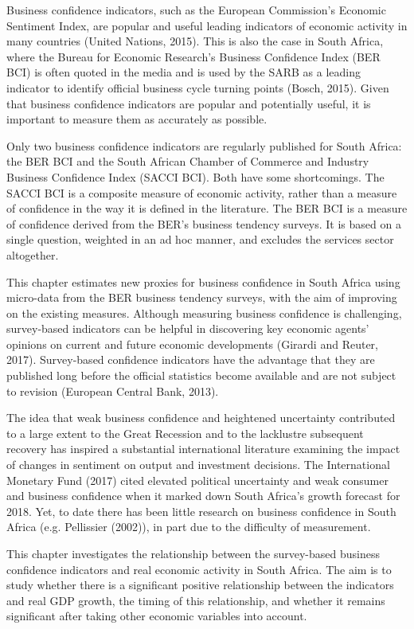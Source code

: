 \documentclass[11pt,]{article}
\begin{document}
Business confidence indicators, such as the European Commission's
Economic Sentiment Index, are popular and useful leading indicators of
economic activity in many countries (United Nations, 2015). This is also
the case in South Africa, where the Bureau for Economic Research's
Business Confidence Index (BER BCI) is often quoted in the media and is
used by the SARB as a leading indicator to identify official business
cycle turning points (Bosch, 2015). Given that business confidence
indicators are popular and potentially useful, it is important to
measure them as accurately as possible.

Only two business confidence indicators are regularly published for
South Africa: the BER BCI and the South African Chamber of Commerce and
Industry Business Confidence Index (SACCI BCI). Both have some
shortcomings. The SACCI BCI is a composite measure of economic activity,
rather than a measure of confidence in the way it is defined in the
literature. The BER BCI is a measure of confidence derived from the
BER's business tendency surveys. It is based on a single question,
weighted in an ad hoc manner, and excludes the services sector
altogether.

This chapter estimates new proxies for business confidence in South
Africa using micro-data from the BER business tendency surveys, with the
aim of improving on the existing measures. Although measuring business
confidence is challenging, survey-based indicators can be helpful in
discovering key economic agents' opinions on current and future economic
developments (Girardi and Reuter, 2017). Survey-based confidence
indicators have the advantage that they are published long before the
official statistics become available and are not subject to revision
(European Central Bank, 2013).

The idea that weak business confidence and heightened uncertainty
contributed to a large extent to the Great Recession and to the
lacklustre subsequent recovery has inspired a substantial international
literature examining the impact of changes in sentiment on output and
investment decisions. The International Monetary Fund (2017) cited
elevated political uncertainty and weak consumer and business confidence
when it marked down South Africa's growth forecast for 2018. Yet, to
date there has been little research on business confidence in South
Africa (e.g. Pellissier (2002)), in part due to the difficulty of
measurement.

This chapter investigates the relationship between the survey-based
business confidence indicators and real economic activity in South
Africa. The aim is to study whether there is a significant positive
relationship between the indicators and real GDP growth, the timing of
this relationship, and whether it remains significant after taking other
economic variables into account.
\end{document}
